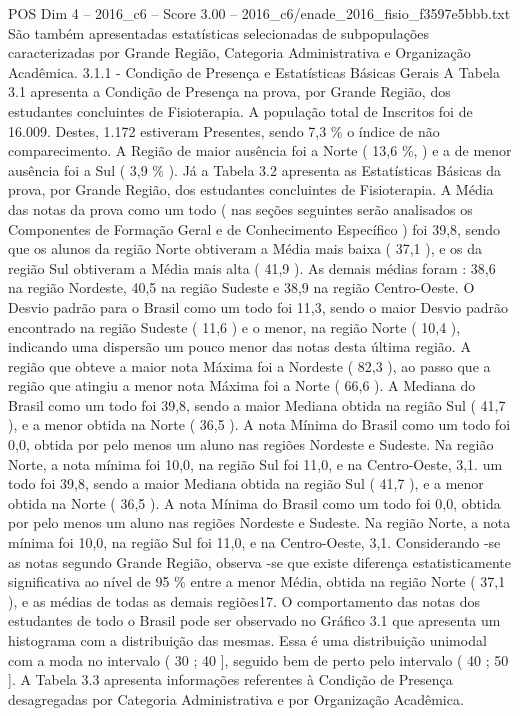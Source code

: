 \begin{textsample}{POS Dim 4 – 2016\_c6 – Score 3.00 – 2016\_c6/enade\_2016\_fisio\_f3597e5bbb.txt}
São também apresentadas estatísticas selecionadas de subpopulações caracterizadas por Grande Região, Categoria Administrativa e Organização Acadêmica. 3.1.1 - Condição de Presença e Estatísticas Básicas Gerais A Tabela 3.1 apresenta a Condição de Presença na prova, por Grande Região, dos estudantes concluintes de Fisioterapia.
A população total de Inscritos foi de 16.009.
Destes, 1.172 estiveram Presentes, sendo 7,3 \% o índice de não comparecimento.
A Região de maior ausência foi a Norte ( 13,6 \%, ) e a de menor ausência foi a Sul ( 3,9 \% ).
Já a Tabela 3.2 apresenta as Estatísticas Básicas da prova, por Grande Região, dos estudantes concluintes de Fisioterapia.
A Média das notas da prova como um todo ( nas seções seguintes serão analisados os Componentes de Formação Geral e de Conhecimento Específico ) foi 39,8, sendo que os alunos da região Norte obtiveram a Média mais baixa ( 37,1 ), e os da região Sul obtiveram a Média mais alta ( 41,9 ).
As demais médias foram : 38,6 na região Nordeste, 40,5 na região Sudeste e 38,9 na região Centro-Oeste.
O Desvio padrão para o Brasil como um todo foi 11,3, sendo o maior Desvio padrão encontrado na região Sudeste ( 11,6 ) e o menor, na região Norte ( 10,4 ), indicando uma dispersão um pouco menor das notas desta última região.
A região que obteve a maior nota Máxima foi a Nordeste ( 82,3 ), ao passo que a região que atingiu a menor nota Máxima foi a Norte ( 66,6 ).
A Mediana do Brasil como um todo foi 39,8, sendo a maior Mediana obtida na região Sul ( 41,7 ), e a menor obtida na Norte ( 36,5 ).
A nota Mínima do Brasil como um todo foi 0,0, obtida por pelo menos um aluno nas regiões Nordeste e Sudeste.
Na região Norte, a nota mínima foi 10,0, na região Sul foi 11,0, e na Centro-Oeste, 3,1. um todo foi 39,8, sendo a maior Mediana obtida na região Sul ( 41,7 ), e a menor obtida na Norte ( 36,5 ).
A nota Mínima do Brasil como um todo foi 0,0, obtida por pelo menos um aluno nas regiões Nordeste e Sudeste.
Na região Norte, a nota mínima foi 10,0, na região Sul foi 11,0, e na Centro-Oeste, 3,1.
Considerando -se as notas segundo Grande Região, observa -se que existe diferença estatisticamente significativa ao nível de 95 \% entre a menor Média, obtida na região Norte ( 37,1 ), e as médias de todas as demais regiões17.
O comportamento das notas dos estudantes de todo o Brasil pode ser observado no Gráfico 3.1 que apresenta um histograma com a distribuição das mesmas.
Essa é uma distribuição unimodal com a moda no intervalo ( 30 ; 40 ], seguido bem de perto pelo intervalo ( 40 ; 50 ].
A Tabela 3.3 apresenta informações referentes à Condição de Presença desagregadas por Categoria Administrativa e por Organização Acadêmica.

\end{textsample}
